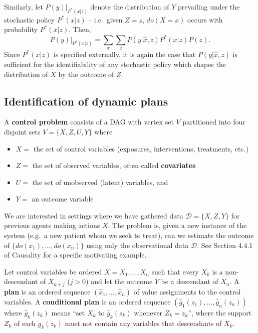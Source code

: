 \documentclass[11pt]{article}
\numberwithin{equation}{section}
\begin{document}
Similarly, let $P(y)|_{P^*(x|z)}$ denote the distribution of $Y$ prevailing under the stochastic policy $P^*(x|z)$ -- i.e.\ given $Z=z$, $do(X=x)$  occurs with probability $P^*(x|z)$. Then,
\begin{equation}
P(y)|_{P^*(x|z)} = \sum_x \sum_z P(y|\hat{x}, z) P^*(x|z) P(z).
\end{equation}
Since $P^*(x|z)$ is specified externally, it is again the case that $P(y|\hat{x}, z)$ is sufficient for the identifiability of any stochastic policy which shapes the distribution of $X$ by the outcome of $Z$.


\subsection{Identification of dynamic plans}

A \textbf{control problem}  consists of a DAG with vertex set $V$ partitioned into four disjoint sets $V=\{X,Z,U,Y\}$ where
\begin{itemize}
\item $X=$ the set of control variables (exposures, interventions, treatments, etc.)
\item $Z=$ the set of observed variables, often called \textbf{covariates}
\item $U=$ the set of unobserved (latent) variables, and
\item $Y=$ an outcome variable
\end{itemize}
We are interested in settings where we have gathered data $\mathcal{D}=\{X,Z,Y\}$ for previous agents making actions $X$. The problem is, given a new instance of the system (e.g.\ a new patient whom we seek to treat), can we estimate the outcome of $\{do(x_1),...,do(x_n)\}$ using only the observational data $\mathcal{D}$. See Section 4.4.1 of Causality for a specific motivating example.

Let control variables be ordered $X=X_1,...,X_n$ such that every $X_k$ is a non-descendant of $X_{k+j}$ ($j>0$) and let the outcome $Y$ be a descendant of $X_n$. A \textbf{plan} is an ordered sequence $(\hat{x}_1,...,\hat{x}_n)$ of value assignments to the control variables. A \textbf{conditional plan} is an ordered sequence $(\hat{g}_1(z_1),...,\hat{g}_n(z_n))$ where $\hat{g}_k(z_k)$ means ``set $X_k$ to $\hat{g}_k(z_k)$ whenever $Z_k=z_k$'', where the support $Z_k$ of each $g_k(z_k)$ must not contain any variables that descendants of $X_k$.
\end{document}
